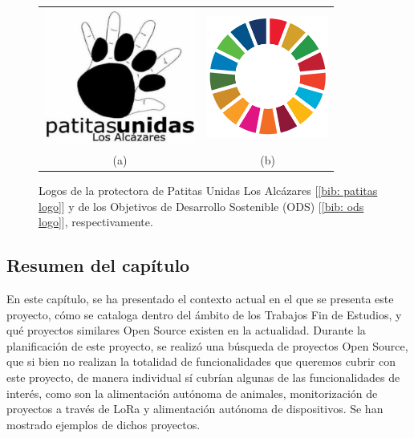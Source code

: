 \documentclass[12pt]{article}
\begin{document}
	\begin{figure} [h!]
		\begin{center}
			\begin{tabular}{cc}
				\includegraphics[width=50mm]{img/patitas_logo.jpg} &   \includegraphics[width=40mm]{img/ODS_logo.png} \\
				(a)  & (b) \\ [10pt]
			\end{tabular}
			\caption{Logos de la protectora de Patitas Unidas Los Alcázares [\ref{bib: patitas logo}] y de los Objetivos de Desarrollo Sostenible (ODS) [\ref{bib: ods logo}], respectivamente.}
			\label{Estado del arte: logos}
		\end{center}
	\end{figure}

	\subsection[Resumen del capítulo]{Resumen del capítulo}
	
	\noindent En este capítulo, se ha presentado el contexto actual en el que se presenta este proyecto, cómo se cataloga dentro del ámbito de los Trabajos Fin de Estudios, y qué proyectos similares Open Source existen en la actualidad. Durante la planificación de este proyecto, se realizó una búsqueda de proyectos Open Source, que si bien no realizan la totalidad de funcionalidades que queremos cubrir con este proyecto, de manera individual sí cubrían algunas de las funcionalidades de interés, como son la alimentación autónoma de animales, monitorización de proyectos a través de LoRa y alimentación autónoma de dispositivos. Se han mostrado ejemplos de dichos proyectos.
	
\end{document}
